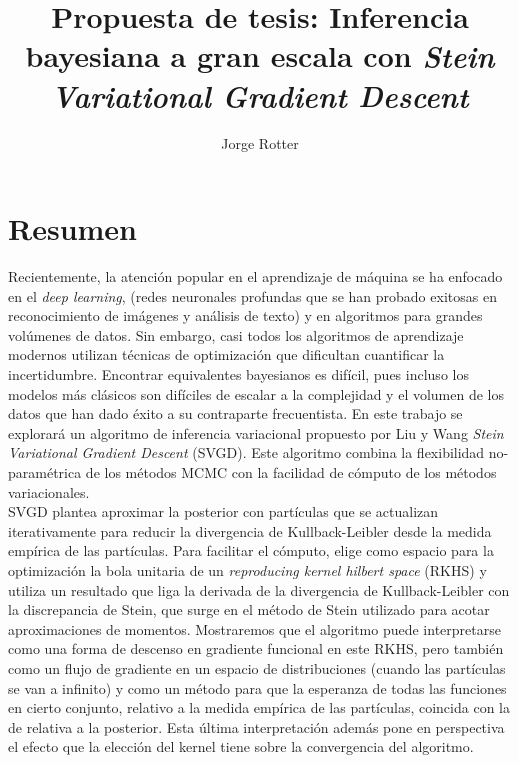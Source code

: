 \documentclass[11pt]{article}
\begin{document}
\title{Propuesta de tesis: Inferencia bayesiana a gran escala con \textit{Stein
Variational Gradient Descent}}
\author{Jorge Rotter}
\date{}
\maketitle

\section{Resumen}

Recientemente, la atención popular en el aprendizaje de máquina se ha enfocado
en el \textit{deep learning}, (redes neuronales profundas que se han probado
exitosas en reconocimiento de imágenes y análisis de texto) y en algoritmos
para grandes volúmenes de datos. Sin embargo, casi todos los algoritmos de
aprendizaje modernos utilizan técnicas de optimización  que dificultan
cuantificar la incertidumbre. Encontrar equivalentes bayesianos es difícil,
pues incluso los modelos más clásicos son difíciles de escalar a la complejidad
y el volumen de los datos que han dado éxito a su contraparte frecuentista. 
En este trabajo se explorará un algoritmo de inferencia variacional propuesto
por Liu y Wang \cite{svgd} \textit{Stein Variational Gradient Descent} (SVGD).
Este algoritmo combina la flexibilidad no-paramétrica de los métodos MCMC con
la facilidad de cómputo de los métodos variacionales. \\

SVGD plantea aproximar la posterior con partículas que se actualizan
iterativamente para reducir la divergencia de Kullback-Leibler desde la medida
empírica de las partículas. Para facilitar el cómputo, elige como espacio para
la optimización la bola unitaria de un \textit{reproducing kernel hilbert
space} (RKHS) y utiliza un resultado que liga la derivada de la divergencia de
Kullback-Leibler con la discrepancia de Stein, que surge en el método de Stein
utilizado para acotar aproximaciones de momentos. Mostraremos que el algoritmo
puede interpretarse como una forma de descenso en gradiente funcional en este
RKHS, pero también como un flujo de gradiente en un espacio de distribuciones
(cuando las partículas se van a infinito) y como un método para que la
esperanza de todas las funciones en cierto conjunto, relativo a la medida
empírica de las partículas, coincida con la de relativa a la posterior. Esta
última interpretación además pone en perspectiva el efecto que la elección del
kernel tiene sobre la convergencia del algoritmo.\\
\end{document}
